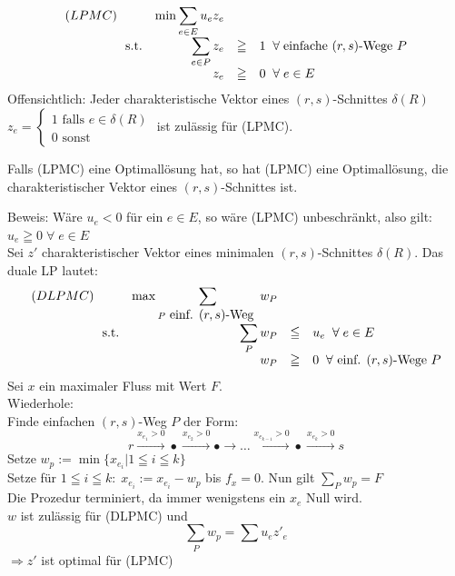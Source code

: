 \[\begin{array}{rrcl}
(LPMC)\hspace{7mm}& \min \displaystyle \sum_{e \in E} u_{e} z_{e}\\
\mbox{s.t.}& \displaystyle \sum_{e\in P} z_{e} &\geqq& 1 \; \; \forall \;
\mbox{einfache $(r,s)$-Wege $P$}\\
&z_{e} &\geqq&0 \; \; \forall \; e \in E \end{array} 
\]
Offensichtlich: Jeder charakteristische Vektor eines $(r,s)$-Schnittes
$\delta(R)$ $z_{e}=\left\{ \begin{array}{l}\mbox{1 falls $e \in \delta(R)$}\\
\mbox{0 sonst}\end{array}\right.$ ist zulässig für (LPMC).
\begin{satz}
Falls (LPMC) eine Optimallösung hat, so hat (LPMC) eine Optimallösung, die
charakteristischer Vektor eines $(r,s)$-Schnittes ist.
\end{satz}
Beweis: Wäre $u_{e} < 0$ für ein $e \in E$, so wäre (LPMC) unbeschränkt,
also gilt: $u_{e} \geqq 0 \; \forall \; e \in E$\\
Sei $z'$ charakteristischer Vektor eines minimalen $(r,s)$-Schnittes
$\delta(R)$. Das duale LP lautet:
\[\begin{array}{rrcl}
(DLPMC)\hspace{7mm}& \max \displaystyle \sum_{P \mbox{ einf. $(r,s)$-Weg }}
w_{P}\\
\mbox{s.t.}&\displaystyle \sum_{P} w_{P} &\leqq & u_{e} \; \; \forall \; e \in E\\
&w_{P} &\geqq & 0 \; \; \forall \mbox{ einf. $(r,s)$-Wege } P \end{array}
\]
Sei $x$ ein maximaler Fluss mit Wert $F$.\\
Wiederhole:\\
Finde einfachen $(r,s)$-Weg $P$ der Form:
\[r\stackrel{x_{e_{1}}>0}{\longrightarrow}\bullet
\stackrel{x_{e_{2}}>0}{\longrightarrow}\bullet\longrightarrow \ldots
\stackrel{x_{e_{k-1}}>0}{\longrightarrow}\bullet
\stackrel{x_{e_{k}}>0}{\longrightarrow}s\]
Setze $w_{p} := \min\{x_{e_{i}} | 1 \leqq i \leqq k\}$\\
Setze für $1 \leqq i \leqq k: \; x_{e_{i}} := x_{e_{i}} -w_{p}$ bis $f_{x} = 0$. Nun gilt $\displaystyle \sum_{P} w_{p} = F$\\
Die Prozedur terminiert, da immer wenigstens ein $x_{e}$ Null wird.\\
$w$ ist zulässig für (DLPMC) und 
\[\sum_{P} w_{p} = \sum u_{e} z'_{e}\]
$\Rightarrow z'$ ist optimal für (LPMC)

